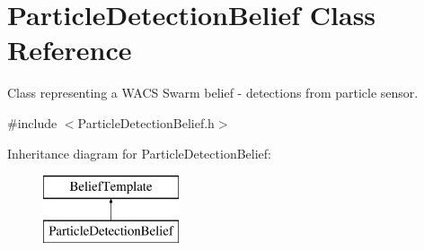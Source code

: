 \hypertarget{class_particle_detection_belief}{
\section{ParticleDetectionBelief Class Reference}
\label{class_particle_detection_belief}
}


Class representing a WACS Swarm belief -\/ detections from particle sensor.  




{\ttfamily \#include $<$ParticleDetectionBelief.h$>$}

Inheritance diagram for ParticleDetectionBelief:\begin{figure}[H]
\begin{center}
\leavevmode
\includegraphics[height=2.000000cm]{class_particle_detection_belief}
\end{center}
\end{figure}
